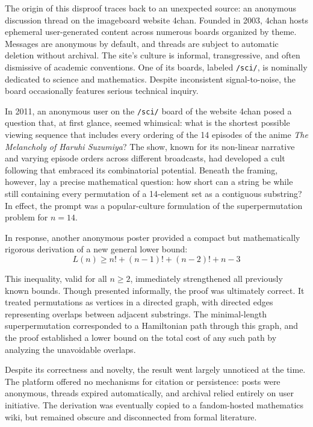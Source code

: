 The origin of this disproof traces back to an unexpected source: an anonymous discussion thread on the imageboard website 4chan. Founded in 2003, 4chan hosts ephemeral user-generated content across numerous boards organized by theme. Messages are anonymous by default, and threads are subject to automatic deletion without archival. The site's culture is informal, transgressive, and often dismissive of academic conventions. One of its boards, labeled \texttt{/sci/}, is nominally dedicated to science and mathematics. Despite inconsistent signal-to-noise, the board occasionally features serious technical inquiry.

In 2011, an anonymous user on the \texttt{/sci/} board of the website 4chan posed a question that, at first glance, seemed whimsical: what is the shortest possible viewing sequence that includes every ordering of the 14 episodes of the anime \emph{The Melancholy of Haruhi Suzumiya}? The show, known for its non-linear narrative and varying episode orders across different broadcasts, had developed a cult following that embraced its combinatorial potential. Beneath the framing, however, lay a precise mathematical question: how short can a string be while still containing every permutation of a 14-element set as a contiguous substring? In effect, the prompt was a popular-culture formulation of the superpermutation problem for $n = 14$.

In response, another anonymous poster provided a compact but mathematically rigorous derivation of a new general lower bound:
$$
L(n) \geq n! + (n - 1)! + (n - 2)! + n - 3
$$

This inequality, valid for all $n \geq 2$, immediately strengthened all previously known bounds. Though presented informally, the proof was ultimately correct. It treated permutations as vertices in a directed graph, with directed edges representing overlaps between adjacent substrings. The minimal-length superpermutation corresponded to a Hamiltonian path through this graph, and the proof established a lower bound on the total cost of any such path by analyzing the unavoidable overlaps.

Despite its correctness and novelty, the result went largely unnoticed at the time. The platform offered no mechanisms for citation or persistence: posts were anonymous, threads expired automatically, and archival relied entirely on user initiative. The derivation was eventually copied to a fandom-hosted mathematics wiki, but remained obscure and disconnected from formal literature.


